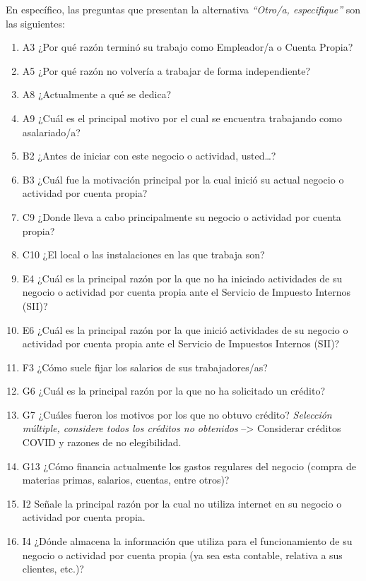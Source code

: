 \documentclass[
]{article}
\providecommand{\tightlist}{%
  \setlength{\itemsep}{0pt}\setlength{\parskip}{0pt}}
\begin{document}
En específico, las preguntas que presentan la alternativa \emph{``Otro/a, especifique''} son las siguientes:

\begin{enumerate}
\def\labelenumi{\arabic{enumi}.}
\tightlist
\item
  A3 ¿Por qué razón terminó su trabajo como Empleador/a o Cuenta Propia?
\item
  A5 ¿Por qué razón no volvería a trabajar de forma independiente?
\item
  A8 ¿Actualmente a qué se dedica?
\item
  A9 ¿Cuál es el principal motivo por el cual se encuentra trabajando como asalariado/a?
\item
  B2 ¿Antes de iniciar con este negocio o actividad, usted\ldots?
\item
  B3 ¿Cuál fue la motivación principal por la cual inició su actual negocio o actividad por cuenta propia?
\item
  C9 ¿Donde lleva a cabo principalmente su negocio o actividad por cuenta propia?
\item
  C10 ¿El local o las instalaciones en las que trabaja son?
\item
  E4 ¿Cuál es la principal razón por la que no ha iniciado actividades de su negocio o actividad por cuenta propia ante el Servicio de Impuesto Internos (SII)?
\item
  E6 ¿Cuál es la principal razón por la que inició actividades de su negocio o actividad por cuenta propia ante el Servicio de Impuestos Internos (SII)?
\item
  F3 ¿Cómo suele fijar los salarios de sus trabajadores/as?
\item
  G6 ¿Cuál es la principal razón por la que no ha solicitado un crédito?
\item
  G7 ¿Cuáles fueron los motivos por los que no obtuvo crédito? \emph{Selección múltiple, considere todos los créditos no obtenidos} --\textgreater{} Considerar créditos COVID y razones de no elegibilidad.
\item
  G13 ¿Cómo financia actualmente los gastos regulares del negocio (compra de materias primas, salarios, cuentas, entre otros)?
\item
  I2 Señale la principal razón por la cual no utiliza internet en su negocio o actividad por cuenta propia.
\item
  I4 ¿Dónde almacena la información que utiliza para el funcionamiento de su negocio o actividad por cuenta propia (ya sea esta contable, relativa a sus clientes, etc.)?

\end{enumerate}
\end{document}
